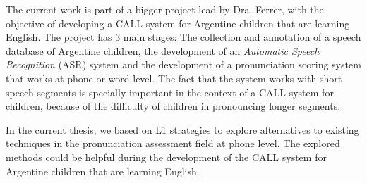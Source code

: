 
The current work is part of a bigger project lead by Dra. Ferrer, with the objective
of developing a CALL system for Argentine children that are learning English.
The project has 3 main stages: The collection and annotation of a speech database
of Argentine children, the development of an \textit{Automatic Speech Recognition} (ASR) system and the development of a pronunciation scoring system that works at phone or word
level. The fact that the system works with short speech segments is specially important in
the context of a CALL system for children, because of the difficulty of children in
pronouncing longer segments.

In the current thesis, we based on L1 strategies to
explore alternatives to existing techniques in the
pronunciation assessment field at phone level. The explored
methods could be helpful
during the development of the CALL system for Argentine children that are learning English.
